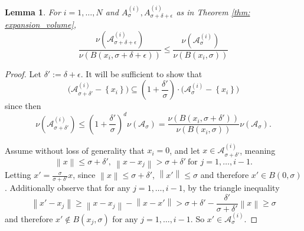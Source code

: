 \documentclass{article}
\newcommand{\norm}[1]{\left\lVert#1\right\rVert}
\newcommand{\set}[1]{\left\{#1\right\}}
\newcommand{\Aset}{\mathcal{A}}
\newcommand{\Asig}{\Aset_{\sigma}}
\newcommand{\1}{\mathbf{1}}
\theoremstyle{alden}
\theoremstyle{aldenthm}
\newtheorem{lemma}{Lemma}
\theoremstyle{remark}
\begin{document}
\begin{lemma}
	\label{lem: covering}
	For $i = 1, \ldots, N$ and  $A_{\sigma}^{(i)}, A_{\sigma + \delta + \epsilon}^{(i)}$ as in Theorem \ref{thm: expansion_volume},
	\begin{equation*}
	\frac{\nu(\Aset_{\sigma + \delta + \epsilon}^{(i)})}{\nu(B(x_i, \sigma + \delta + \epsilon))} \leq \frac{\nu(\Aset_{\sigma}^{(i)})}{\nu(B(x_i, \sigma))}
	\end{equation*}
\end{lemma}
\begin{proof}
	Let $\delta' := \delta + \epsilon$. It will be sufficient to show that
	\begin{equation*}
	\biggl(\Aset_{\sigma + \delta'}^{(i)} - \set{x_i}\biggr) \subseteq \left(1 + \frac{\delta'}{\sigma}\right)\cdot\biggl(\Asig^{(i)} - \set{x_i}\biggr) 
	\end{equation*}
	since then
	\begin{equation*}
	\nu(\Aset_{\sigma + \delta'}^{(i)}) \leq \left(1 + \frac{\delta'}{\sigma}\right)^d \nu(\Aset_{\sigma}) = \frac{\nu(B(x_i, \sigma + \delta'))}{\nu(B(x_i, \sigma))} \nu(\Aset_{\sigma}).
	\end{equation*}
	
	Assume without loss of generality that $x_i = 0$, and let $x \in \Aset_{\sigma + \delta'}^{(i)}$, meaning
	\begin{equation}
	\norm{x} \leq \sigma + \delta',~ \norm{x - x_j} > \sigma + \delta'~ \textrm{for $j = 1, \ldots, i - 1$}.
	\end{equation}
	Letting $x' = \frac{\sigma}{\sigma + \delta'} x$, since $\norm{x} \leq \sigma + \delta'$, $\norm{x'} \leq \sigma$ and therefore $x' \in B(0,\sigma)$. Additionally observe that for any $j = 1, \ldots, i - 1$, by the triangle inequality
	\begin{equation*}
	\norm{x' - x_j} \geq \norm{x - x_j} - \norm{x - x'} > \sigma + \delta' - \frac{\delta'}{\sigma + \delta'}\norm{x} \geq \sigma
	\end{equation*}
	and therefore $x' \not\in B(x_j,\sigma)$ for any $j = 1,\ldots, i - 1$. So $x' \in \Asig^{(i)}$.
\end{proof}
\end{document}
